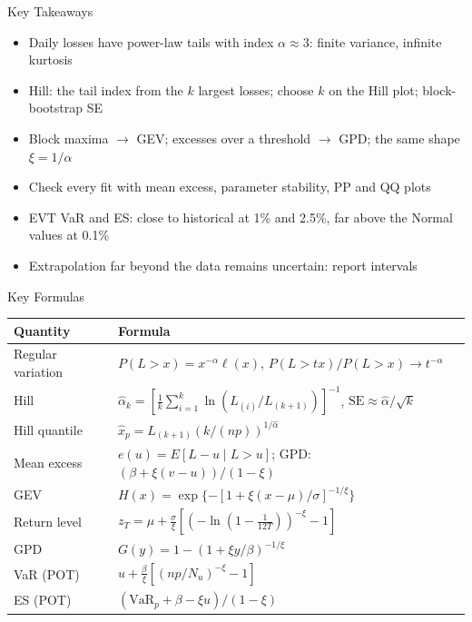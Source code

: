\begin{frame}{Key Takeaways}
\itemsize{\small}
\begin{itemize}
    \item Daily losses have power-law tails with index $\alpha \approx 3$: finite variance, infinite kurtosis
    \item Hill: the tail index from the $k$ largest losses; choose $k$ on the Hill plot; block-bootstrap SE
    \item Block maxima $\to$ GEV; excesses over a threshold $\to$ GPD; the same shape $\xi = 1/\alpha$
    \item Check every fit with mean excess, parameter stability, PP and QQ plots
    \item EVT VaR and ES: close to historical at 1\% and 2.5\%, far above the Normal values at 0.1\%
    \item Extrapolation far beyond the data remains uncertain: report intervals
\end{itemize}
\end{frame}

\begin{frame}{Key Formulas}
\itemsize{\small}
{\renewcommand{\arraystretch}{1.45}\begin{center}
\footnotesize
\begin{tabular}{ll}
\toprule
\textbf{Quantity} & \textbf{Formula} \\
\midrule
Regular variation & $P(L > x) = x^{-\alpha}\ell(x)$, \quad $P(L > tx)/P(L > x) \to t^{-\alpha}$ \\
Hill & $\hat\alpha_k = [\frac1k\sum_{i=1}^k \ln(L_{(i)}/L_{(k+1)})]^{-1}$, \quad $\mathrm{SE} \approx \hat\alpha/\sqrt{k}$ \\
Hill quantile & $\hat x_p = L_{(k+1)}(k/(np))^{1/\hat\alpha}$ \\
Mean excess & $e(u) = E[L - u \mid L > u]$; \quad GPD: $(\beta + \xi(v - u))/(1 - \xi)$ \\
GEV & $H(x) = \exp\{-[1 + \xi(x - \mu)/\sigma]^{-1/\xi}\}$ \\
Return level & $z_T = \mu + \frac{\sigma}{\xi}[(-\ln(1 - \frac{1}{12T}))^{-\xi} - 1]$ \\
GPD & $G(y) = 1 - (1 + \xi y/\beta)^{-1/\xi}$ \\
VaR (POT) & $u + \frac{\beta}{\xi}[(np/N_u)^{-\xi} - 1]$ \\
ES (POT) & $(\mathrm{VaR}_p + \beta - \xi u)/(1 - \xi)$ \\
\bottomrule
\end{tabular}
\end{center}
}
\end{frame}

